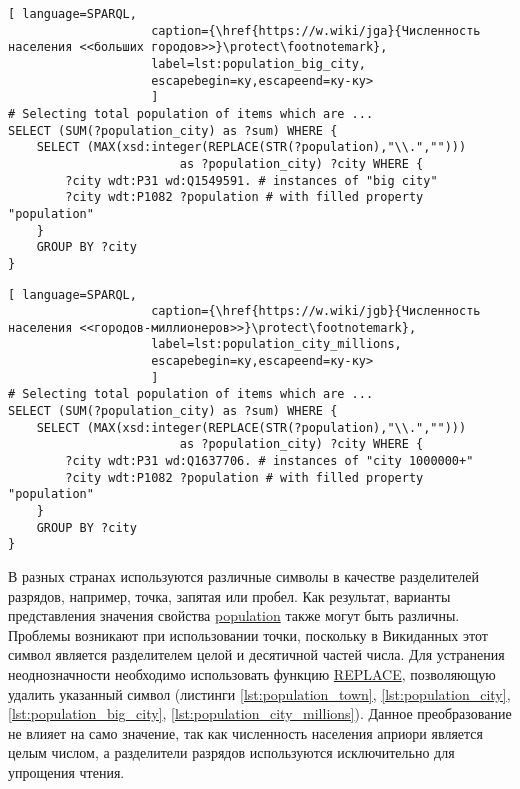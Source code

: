 \begin{lstlisting}[ language=SPARQL, 
                    caption={\href{https://w.wiki/jga}{Численность населения <<больших городов>>}\protect\footnotemark},
                    label=lst:population_big_city, 
                    escapebegin=ку,escapeend=ку-ку>
                    ]
# Selecting total population of items which are ...
SELECT (SUM(?population_city) as ?sum) WHERE {                    
	SELECT (MAX(xsd:integer(REPLACE(STR(?population),"\\.",""))) 
						as ?population_city) ?city WHERE {
		?city wdt:P31 wd:Q1549591. # instances of "big city"
		?city wdt:P1082 ?population # with filled property "population"
	}
	GROUP BY ?city
}
\end{lstlisting}

\newpage
\begin{lstlisting}[ language=SPARQL, 
                    caption={\href{https://w.wiki/jgb}{Численность населения <<городов-миллионеров>>}\protect\footnotemark},
                    label=lst:population_city_millions, 
                    escapebegin=ку,escapeend=ку-ку>
                    ]
# Selecting total population of items which are ...
SELECT (SUM(?population_city) as ?sum) WHERE {
	SELECT (MAX(xsd:integer(REPLACE(STR(?population),"\\.",""))) 
						as ?population_city) ?city WHERE {
		?city wdt:P31 wd:Q1637706. # instances of "city 1000000+"
		?city wdt:P1082 ?population # with filled property "population"
	}
	GROUP BY ?city
}
\end{lstlisting}

В разных странах используются различные символы в качестве разделителей разрядов, например, точка, запятая или пробел. Как результат, варианты представления значения свойства \href{https://www.wikidata.org/wiki/Property:P1082}{population} также могут быть различны. Проблемы возникают при использовании точки, поскольку в Викиданных этот символ является разделителем целой и десятичной частей числа. Для устранения неоднозначности необходимо использовать функцию \href{https://en.wikibooks.org/wiki/SPARQL/Expressions\_and\_Functions\#REPLACE}{REPLACE}, позволяющую удалить указанный символ (листинги \ref{lst:population_town}, \ref{lst:population_city}, \ref{lst:population_big_city}, \ref{lst:population_city_millions}). Данное преобразование не влияет на само значение, так как численность населения априори является целым числом, а разделители разрядов используются исключительно для упрощения чтения.

